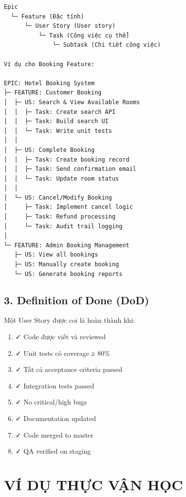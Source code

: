 \documentclass[12pt, a4paper]{report}
\begin{document}
\begin{tcolorbox}[colback=yellow!5]
\begin{lstlisting}
Epic
  └─ Feature (Đặc tính)
      └─ User Story (User story)
          └─ Task (Công việc cụ thể)
              └─ Subtask (Chi tiết công việc)

Ví dụ cho Booking Feature:

EPIC: Hotel Booking System
├─ FEATURE: Customer Booking
│  ├─ US: Search & View Available Rooms
│  │  ├─ Task: Create search API
│  │  ├─ Task: Build search UI
│  │  └─ Task: Write unit tests
│  │
│  ├─ US: Complete Booking
│  │  ├─ Task: Create booking record
│  │  ├─ Task: Send confirmation email
│  │  └─ Task: Update room status
│  │
│  └─ US: Cancel/Modify Booking
│     ├─ Task: Implement cancel logic
│     ├─ Task: Refund processing
│     └─ Task: Audit trail logging
│
└─ FEATURE: Admin Booking Management
   ├─ US: View all bookings
   ├─ US: Manually create booking
   └─ US: Generate booking reports
\end{lstlisting}
\end{tcolorbox}

\section{3. Definition of Done (DoD)}

\begin{tcolorbox}[colback=red!5]
Một User Story được coi là hoàn thành khi:

\begin{enumerate}
    \item ✓ Code được viết và reviewed
    \item ✓ Unit tests có coverage ≥ 80\%
    \item ✓ Tất cả acceptance criteria passed
    \item ✓ Integration tests passed
    \item ✓ No critical/high bugs
    \item ✓ Documentation updated
    \item ✓ Code merged to master
    \item ✓ QA verified on staging
\end{enumerate}
\end{tcolorbox}

\newpage

\chapter{VÍ DỤ THỰC VẬN HỌC}
\end{document}
